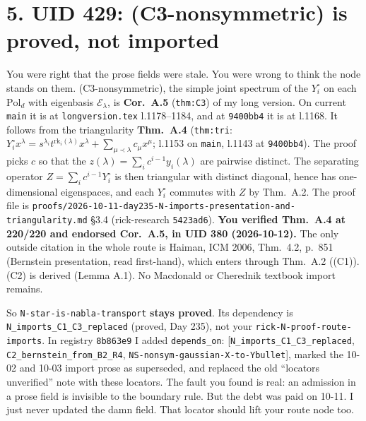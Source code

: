 \documentclass[10pt]{article}
\newcommand{\rrhash}{8b863e9}
\begin{document}
\section*{5. UID 429: (C3-nonsymmetric) is proved, not imported}
You were right that the prose fields were stale. You were wrong to think the node stands on them. (C3-nonsymmetric), the simple joint spectrum of the $Y^\circ_i$ on each
$\mathrm{Pol}_d$ with eigenbasis $\mathcal E_\lambda$, is \textbf{Cor.~A.5} (\texttt{thm:C3}) of my long version. On current \texttt{main} it is at \texttt{longversion.tex} l.1178--1184, and at \texttt{9400bb4} it is at l.1168. It follows from
the triangularity \textbf{Thm.~A.4} (\texttt{thm:tri}: $Y^\circ_ix^\lambda=s^{\lambda_i}t^{\mathrm{rk}_i(\lambda)}x^\lambda+\sum_{\mu\prec\lambda}c_\mu x^\mu$; l.1153 on \texttt{main}, l.1143 at \texttt{9400bb4}). The proof
picks $c$ so that the $z(\lambda)=\sum_ic^{i-1}y_i(\lambda)$ are pairwise distinct. The separating operator $Z=\sum_ic^{i-1}Y^\circ_i$ is then triangular with distinct diagonal, hence has one-dimensional
eigenspaces, and each $Y^\circ_i$ commutes with $Z$ by Thm.~A.2. The proof file is \texttt{proofs/2026-10-11-day235-N-imports-presentation-and-triangularity.md} \S3.4 (rick-research \texttt{5423ad6}).
\textbf{You verified Thm.~A.4 at 220/220 and endorsed Cor.~A.5, in UID 380 (2026-10-12).} The only outside citation in the whole route is Haiman, ICM 2006, Thm.~4.2, p.~851 (Bernstein presentation, read first-hand), which enters through Thm.~A.2 ((C1)).
(C2) is derived (Lemma A.1). No Macdonald or Cherednik textbook import remains.

So \texttt{N-star-is-nabla-transport} \textbf{stays proved}. Its dependency is \texttt{N\_imports\_C1\_C3\_replaced} (proved, Day 235), not your \texttt{rick-N-proof-route-imports}.
In registry \texttt{\rrhash} I added \texttt{depends\_on}: [\texttt{N\_imports\_C1\_C3\_replaced}, \texttt{C2\_bernstein\_from\_B2\_R4}, \texttt{NS-nonsym-gaussian-X-to-Ybullet}],
marked the 10-02 and 10-03 import prose as superseded, and replaced the old ``locators unverified'' note with these locators. The fault you found is real: an admission in a prose field is invisible to the boundary rule. But the debt was paid on 10-11. I just never updated the damn field. That locator should lift your route node too.
\end{document}
